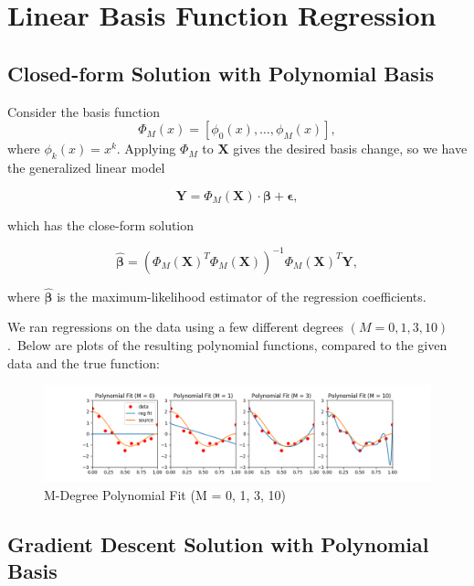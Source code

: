 \documentclass{article}
\begin{document}
\section{Linear Basis Function Regression}

\subsection{Closed-form Solution with Polynomial Basis}
Consider the basis function $$\Phi_M(x) = [\phi_0(x), \dots, \phi_M(x)],$$ where $\phi_k(x) = x^k$. Applying $\Phi_M$ to $\mathbf{X}$ gives the desired basis change, so we have the generalized linear model

$$\mathbf Y = \Phi_M(\mathbf X) \cdot \bm \beta + \bm \epsilon,$$

which has the close-form solution

$$\hat{\bm \beta} = (\Phi_M(\mathbf X)^T \Phi_M(\mathbf X))^{-1} \Phi_M(\mathbf X)^T \mathbf Y,$$

where $\hat{\bm \beta}$ is the maximum-likelihood estimator of the regression coefficients.

We ran regressions on the data using a few different degrees $(M = 0, 1, 3, 10)$.\footnotemark\ Below are plots of the resulting polynomial functions, compared to the given data and the true function:


\begin{figure}[H]
  \centering
  \includegraphics[width = 6.8in]{../P2/figs/part_1.png}
  \caption{M-Degree Polynomial Fit (M = 0, 1, 3, 10)}
\end{figure}

\subsection{Gradient Descent Solution with Polynomial Basis}
\end{document}
